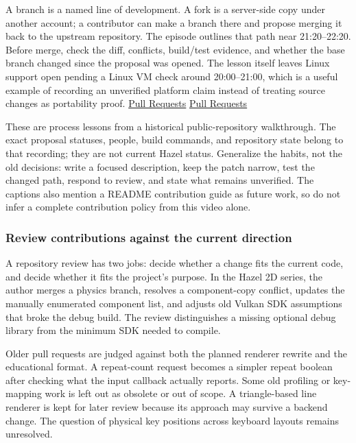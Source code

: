 A branch is a named line of development. A fork is a server-side copy under another account; a contributor can make a branch there and propose merging it back to the upstream repository. The episode outlines that path near 21:20--22:20. Before merge, check the diff, conflicts, build/test evidence, and whether the base branch changed since the proposal was opened. The lesson itself leaves Linux support open pending a Linux VM check around 20:00--21:00, which is a useful example of recording an unverified platform claim instead of treating source changes as portability proof. \href{https://www.youtube.com/watch?v=h0OgLT6KJi8&t=1280s}{Pull Requests} \href{https://www.youtube.com/watch?v=h0OgLT6KJi8&t=1200s}{Pull Requests}

These are process lessons from a historical public-repository walkthrough. The exact proposal statuses, people, build commands, and repository state belong to that recording; they are not current Hazel status. Generalize the habits, not the old decisions: write a focused description, keep the patch narrow, test the changed path, respond to review, and state what remains unverified. The captions also mention a README contribution guide as future work, so do not infer a complete contribution policy from this video alone.

\subsubsection{Review contributions against the current direction}\label{06-engine-ii-ch040-review-contributions-against-the-current-direction}

A repository review has two jobs: decide whether a change fits the current code, and decide whether it fits the project's purpose. In the Hazel 2D series, the author merges a physics branch, resolves a component-copy conflict, updates the manually enumerated component list, and adjusts old Vulkan SDK assumptions that broke the debug build. The review distinguishes a missing optional debug library from the minimum SDK needed to compile.

Older pull requests are judged against both the planned renderer rewrite and the educational format. A repeat-count request becomes a simpler repeat boolean after checking what the input callback actually reports. Some old profiling or key-mapping work is left out as obsolete or out of scope. A triangle-based line renderer is kept for later review because its approach may survive a backend change. The question of physical key positions across keyboard layouts remains unresolved.

